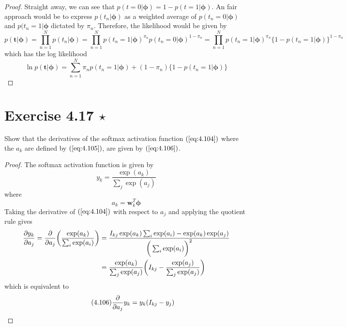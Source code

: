 \vspace{1em}

\begin{proof}
    Straight away, we can see that $p(t = 0 | \bm{\phi}) = 1 - p(t = 1 | \bm{\phi})$.
    An fair approach would be to express $p(t_n | \bm{\phi})$ as a weighted
    average of $p(t_n = 0 | \bm{\phi})$ and $p(t_n = 1 | \bm{\phi}$ dictated by $\pi_n$.
    Therefore, the likelihood would be given by 
    \[
        p(\mathbf{t} | \bm{\phi})
        = \prod_{n = 1}^N p(t_n | \bm{\phi})
        = \prod_{n = 1}^N p(t_n = 1 | \bm{\phi})^{\pi_n}
        p(t_n = 0 | \bm{\phi})^{1 - \pi_n}
        = \prod_{n = 1}^N p(t_n = 1 | \bm{\phi})^{\pi_n}
        \big\{1 - p(t_n = 1 | \bm{\phi})\big\}^{1 - \pi_n}
    \] 
    which has the log likelihood
    \[
        \ln p(\mathbf{t} | \bm{\phi}) 
        = \sum_{n=1}^{N} \pi_n p(t_n = 1 | \bm{\phi})
        + (1 - \pi_n)\big\{1 - p(t_n = 1 | \bm{\phi})\big\}
    \] 
\end{proof}

\section*{Exercise 4.17 $\star$}
Show that the derivatives of the softmax activation function
$(\ref{eq:4.104})$ where the $a_k$ are defined by $(\ref{eq:4.105})$, are
given by $(\ref{eq:4.106})$.

\vspace{1em}

\begin{proof}
    The softmax activation function is given by
    \begin{equation}\label{eq:4.104}\tag{4.104}
        y_k = \frac{\exp(a_k)}{\sum_{j} \exp(a_j)}
    \end{equation}
    where
    \begin{equation}\label{eq:4.105}\tag{4.106}
        a_k = \mathbf{w}_k^T\bm{\phi}
    \end{equation}
    Taking the derivative of $(\ref{eq:4.104})$ with respect to
    $a_j$ and applying the quotient rule gives
    \begin{align*}
        \pdv{y_k}{a_j} 
        = \pdv{a_j} \bigg(\frac{\exp(a_k)}{\sum_{i} \exp(a_i)}\bigg)
        &= \frac{I_{kj} \exp(a_k) \sum_{i} \exp(a_i) - \exp(a_k)\exp(a_j)} 
        {\bigg(\sum_{i} \exp(a_i)\bigg)^2} \\
        &= \frac{\exp(a_k)}{\sum_{j} \exp(a_j)}
        \bigg(I_{kj} - \frac{\exp(a_j)}{\sum_{j} \exp(a_j)}\bigg)
    \end{align*}
    which is equivalent to 
    \begin{equation}\label{eq:4.106}\tag{4.106}
        \pdv{a_j} y_k = y_k(I_{kj} - y_j)
    \end{equation}
\end{proof}

